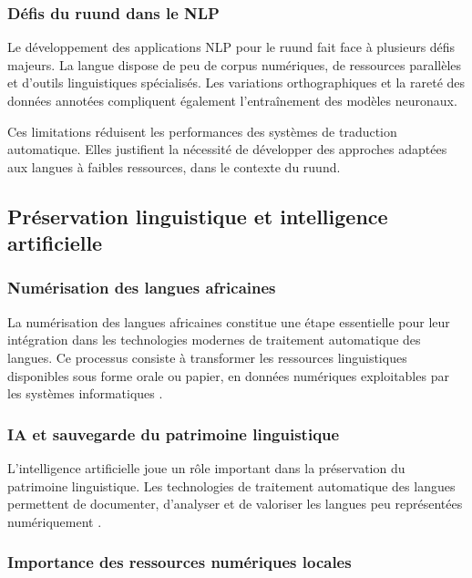 \subsubsection{Défis du ruund dans le NLP}

Le développement des applications \ac{NLP} pour le ruund fait face à plusieurs défis majeurs. La langue dispose de peu de corpus numériques, de ressources parallèles et d'outils linguistiques spécialisés. Les variations orthographiques et la rareté des données annotées compliquent également l'entraînement des modèles neuronaux.

Ces limitations réduisent les performances des systèmes de traduction automatique. Elles justifient la nécessité de développer des approches adaptées aux langues à faibles ressources, dans le contexte du ruund.

\subsection{Préservation linguistique et intelligence artificielle}

\subsubsection{Numérisation des langues africaines}

La numérisation des langues africaines constitue une étape essentielle pour leur intégration dans les technologies modernes de traitement automatique des langues. Ce processus consiste à transformer les ressources linguistiques disponibles sous forme orale ou papier, en données numériques exploitables par les systèmes informatiques \cite{agyei2024low, mandiya2026lingala}.

\subsubsection{IA et sauvegarde du patrimoine linguistique}

L'intelligence artificielle joue un rôle important dans la préservation du patrimoine linguistique. Les technologies de traitement automatique des langues permettent de documenter, d'analyser et de valoriser les langues peu représentées numériquement \cite{ranathunga2023neural, agyei2025dynamic}.

\subsubsection{Importance des ressources numériques locales}

